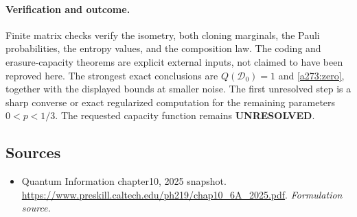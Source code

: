\documentclass[11pt]{article}
\begin{document}
\paragraph{Verification and outcome.}
Finite matrix checks verify the isometry, both cloning marginals, the
Pauli probabilities, the entropy values, and the composition law.
The coding and erasure-capacity theorems are explicit external inputs,
not claimed to have been reproved here. The strongest exact conclusions
are $Q(\mathcal D_0)=1$ and \eqref{a273:zero}, together with the displayed
bounds at smaller noise. The first unresolved step is a sharp converse
or exact regularized computation for the remaining parameters
$0<p<1/3$. The requested capacity function remains
\textbf{UNRESOLVED}.

\subsection{Sources}
\begin{itemize}
\item[S1]Quantum Information chapter10, 2025 snapshot.
\url{https://www.preskill.caltech.edu/ph219/chap10_6A_2025.pdf}.
\textit{Formulation source.}
\end{itemize}
\end{document}
